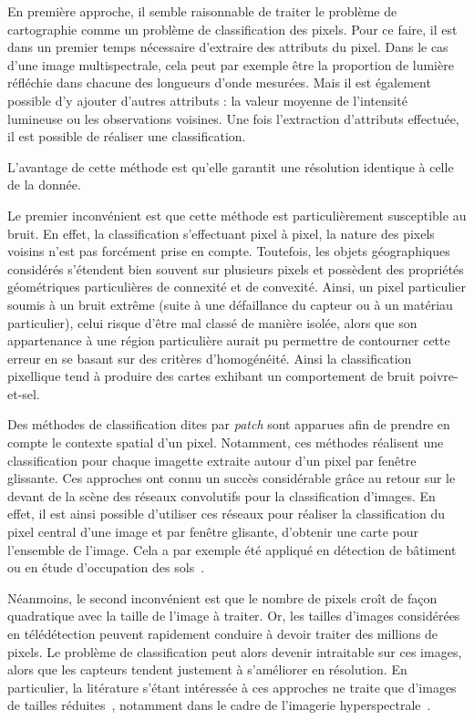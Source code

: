 En première approche, il semble raisonnable de traiter le problème de cartographie comme un problème de classification des pixels. Pour ce faire, il est dans un premier temps nécessaire d'extraire des attributs du pixel. Dans le cas d'une image multispectrale, cela peut par exemple être la proportion de lumière réfléchie dans chacune des longueurs d'onde mesurées. Mais il est également possible d'y ajouter d'autres attributs : la valeur moyenne de l'intensité lumineuse ou les observations voisines. Une fois l'extraction d'attributs effectuée, il est possible de réaliser une classification.

L'avantage de cette méthode est qu'elle garantit une résolution identique à celle de la donnée.

Le premier inconvénient est que cette méthode est particulièrement susceptible au bruit. En effet, la classification s'effectuant pixel à pixel, la nature des pixels voisins n'est pas forcément prise en compte. Toutefois, les objets géographiques considérés s'étendent bien souvent sur plusieurs pixels et possèdent des propriétés géométriques particulières de connexité et de convexité. Ainsi, un pixel particulier soumis à un bruit extrême (suite à une défaillance du capteur ou à un matériau particulier), celui risque d'être mal classé de manière isolée, alors que son appartenance à une région particulière aurait pu permettre de contourner cette erreur en se basant sur des critères d'homogénéité. Ainsi la classification pixellique tend à produire des cartes exhibant un comportement de bruit poivre-et-sel.

Des méthodes de classification dites par \emph{patch} sont apparues afin de prendre en compte le contexte spatial d'un pixel. Notamment, ces méthodes réalisent une classification pour chaque imagette extraite autour d'un pixel par fenêtre glissante. Ces approches ont connu un succès considérable grâce au retour sur le devant de la scène des réseaux convolutifs pour la classification d'images. En effet, il est ainsi possible d'utiliser ces réseaux pour réaliser la classification du pixel central d'une image et par fenêtre glisante, d'obtenir une carte pour l'ensemble de l'image. Cela a par exemple été appliqué en détection de bâtiment~\cite{vakalopoulou_building_2015-1} ou en étude d'occupation des sols~\cite{papadomanolaki_patch-based_2017}.

Néanmoins, le second inconvénient est que le nombre de pixels croît de façon quadratique avec la taille de l'image à traiter. Or, les tailles d'images considérées en télédétection peuvent rapidement conduire à devoir traiter des millions de pixels. Le problème de classification peut alors devenir intraitable sur ces images, alors que les capteurs tendent justement à s'améliorer en résolution. En particulier, la litérature s'étant intéressée à ces approches ne traite que d'images de tailles réduites~\cite{nogueira_learning_2016}, notamment dans le cadre de l'imagerie hyperspectrale~\cite{fauvel_advances_2013}.

